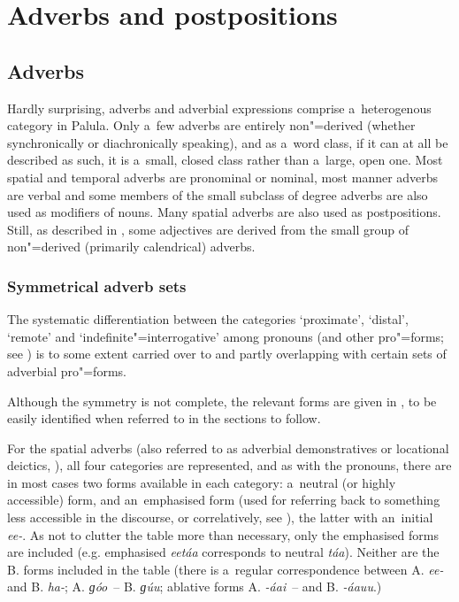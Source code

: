 \chapter{Adverbs and postpositions}
\label{chap:7}

\section{Adverbs}
\label{sec:7-1}


Hardly surprising, adverbs and adverbial expressions comprise a~heterogenous category in Palula. Only a~few adverbs are entirely non"=derived (whether synchronically or diachronically speaking), and as a~word class, if it can at all be described as such, it is a~small, closed class rather than a~large, open one. Most spatial and temporal adverbs are pronominal or nominal, most manner adverbs are verbal and some members of the small subclass of degree adverbs are also used as modifiers of nouns. Many spatial adverbs are also used as postpositions. Still, as described in , some adjectives are derived from the small group of non"=derived (primarily calendrical) adverbs.


\subsection{Symmetrical adverb sets}
\label{subsec:7-1-1}

The systematic differentiation between the categories `proximate', `distal', `remote' and `indefinite"=interrogative' among pronouns (and other pro"=forms; see ) is to some extent carried over to and partly overlapping with certain sets of adverbial pro"=forms. 



Although the symmetry is not complete, the relevant forms are given in , to be easily identified when referred to in the sections to follow.



For the spatial adverbs (also referred to as adverbial demonstratives or locational deictics, \citealt[431]{diessel2006}), all four categories are represented, and as with the pronouns, there are in most cases two forms available in each category: a~neutral (or highly accessible) form, and an~emphasised form (used for referring back to something less accessible in the discourse, or correlatively, see ), the latter with an~initial \textit{ee-}. As not to clutter the table more than necessary, only the emphasised forms are included (e.g. emphasised \textit{eetáa} corresponds to neutral \textit{táa}). Neither are the B. forms included in the table (there is a~regular correspondence between A. \textit{ee-} and B. \textit{ha-}; A. \textit{ɡóo}~-- B. \textit{ɡúu}; ablative forms A. \textit{-áai}~-- and B. \textit{-áauu}.)



